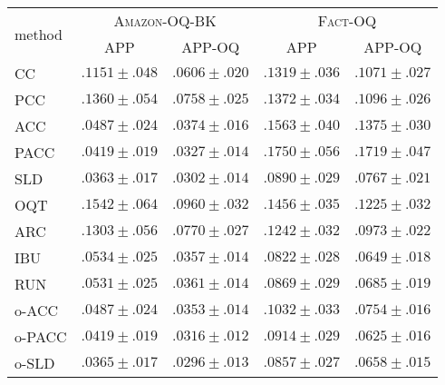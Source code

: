 \begin{tabular}{lcccc}
  \toprule
  \multirow{2}{*}{method} & \multicolumn{2}{c}{\textsc{Amazon-OQ-BK}} & \multicolumn{2}{c}{\textsc{Fact-OQ}} \\
  & APP & APP-OQ & APP & APP-OQ \\
  \midrule
  CC & ${.1151 \pm .048}$ & ${.0606 \pm .020}$ & ${.1319 \pm .036}$ & ${.1071 \pm .027}$ \\
  PCC & ${.1360 \pm .054}$ & ${.0758 \pm .025}$ & ${.1372 \pm .034}$ & ${.1096 \pm .026}$ \\
  ACC & ${.0487 \pm .024}$ & ${.0374 \pm .016}$ & ${.1563 \pm .040}$ & ${.1375 \pm .030}$ \\
  PACC & ${.0419 \pm .019}$ & ${.0327 \pm .014}$ & ${.1750 \pm .056}$ & ${.1719 \pm .047}$ \\
  SLD & $\mathbf{.0363 \pm .017}$ & ${.0302 \pm .014}$ & ${.0890 \pm .029}$ & ${.0767 \pm .021}$ \\[.5em]
  OQT & ${.1542 \pm .064}$ & ${.0960 \pm .032}$ & ${.1456 \pm .035}$ & ${.1225 \pm .032}$ \\
  ARC & ${.1303 \pm .056}$ & ${.0770 \pm .027}$ & ${.1242 \pm .032}$ & ${.0973 \pm .022}$ \\
  IBU & ${.0534 \pm .025}$ & ${.0357 \pm .014}$ & $\mathbf{.0822 \pm .028}$ & ${.0649 \pm .018}$ \\
  RUN & ${.0531 \pm .025}$ & ${.0361 \pm .014}$ & ${.0869 \pm .029}$ & ${.0685 \pm .019}$ \\[.5em]
  o-ACC & ${.0487 \pm .024}$ & ${.0353 \pm .014}$ & ${.1032 \pm .033}$ & ${.0754 \pm .016}$ \\
  o-PACC & ${.0419 \pm .019}$ & ${.0316 \pm .012}$ & ${.0914 \pm .029}$ & $\mathbf{.0625 \pm .016}$ \\
  o-SLD & $\mathbf{.0365 \pm .017}$ & $\mathbf{.0296 \pm .013}$ & ${.0857 \pm .027}$ & ${.0658 \pm .015}$ \\
  \bottomrule
\end{tabular}
